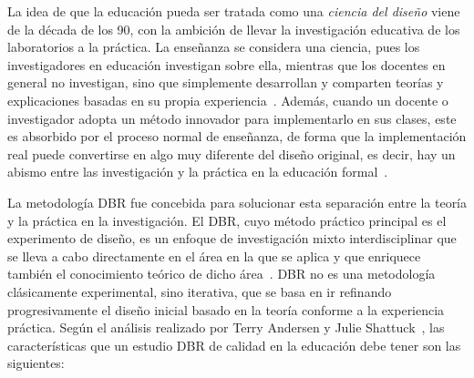 La idea de que la educación pueda ser tratada como una \emph{ciencia del diseño} viene de la década de los 90, con la ambición de llevar la investigación educativa de los laboratorios a la práctica. La enseñanza se considera una ciencia, pues los investigadores en educación investigan sobre ella, mientras que los docentes en general no investigan, sino que simplemente desarrollan y comparten teorías y explicaciones basadas en su propia experiencia~\cite{laurillard2012teaching}. Además, cuando un docente o investigador adopta un método innovador para implementarlo en sus clases, este es absorbido por el proceso normal de enseñanza, de forma que la implementación real puede convertirse en algo muy diferente del diseño original, es decir, hay un abismo entre las investigación y la práctica en la educación formal~\cite{anderson2012design}. 

La metodología DBR fue concebida para solucionar esta separación entre la teoría y la práctica en la investigación. El DBR, cuyo método práctico principal es el experimento de diseño, es un enfoque de investigación mixto interdisciplinar que se lleva a cabo directamente en el área en la que se aplica y que enriquece también el conocimiento teórico de dicho área~\cite{reimann2011design}. DBR no es una metodología clásicamente experimental, sino iterativa, que se basa en ir refinando progresivamente el diseño inicial basado en la teoría conforme a la experiencia práctica. Según el análisis realizado por Terry Andersen y Julie Shattuck~\cite{anderson2012design}, las características que un estudio DBR de calidad en la educación debe tener son las siguientes:

